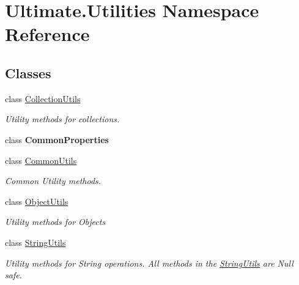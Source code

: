 \hypertarget{namespace_ultimate_1_1_utilities}{}\section{Ultimate.\+Utilities Namespace Reference}
\label{namespace_ultimate_1_1_utilities}
\subsection*{Classes}
\begin{DoxyCompactItemize}
\item 
class \hyperlink{class_ultimate_1_1_utilities_1_1_collection_utils}{Collection\+Utils}
\begin{DoxyCompactList}\small\item\em Utility methods for collections. \end{DoxyCompactList}\item 
class {\bfseries Common\+Properties}
\item 
class \hyperlink{class_ultimate_1_1_utilities_1_1_common_utils}{Common\+Utils}
\begin{DoxyCompactList}\small\item\em Common Utility methods. \end{DoxyCompactList}\item 
class \hyperlink{class_ultimate_1_1_utilities_1_1_object_utils}{Object\+Utils}
\begin{DoxyCompactList}\small\item\em Utility methods for Objects \end{DoxyCompactList}\item 
class \hyperlink{class_ultimate_1_1_utilities_1_1_string_utils}{String\+Utils}
\begin{DoxyCompactList}\small\item\em Utility methods for String operations. All methods in the \hyperlink{class_ultimate_1_1_utilities_1_1_string_utils}{String\+Utils} are Null safe. \end{DoxyCompactList}\end{DoxyCompactItemize}
